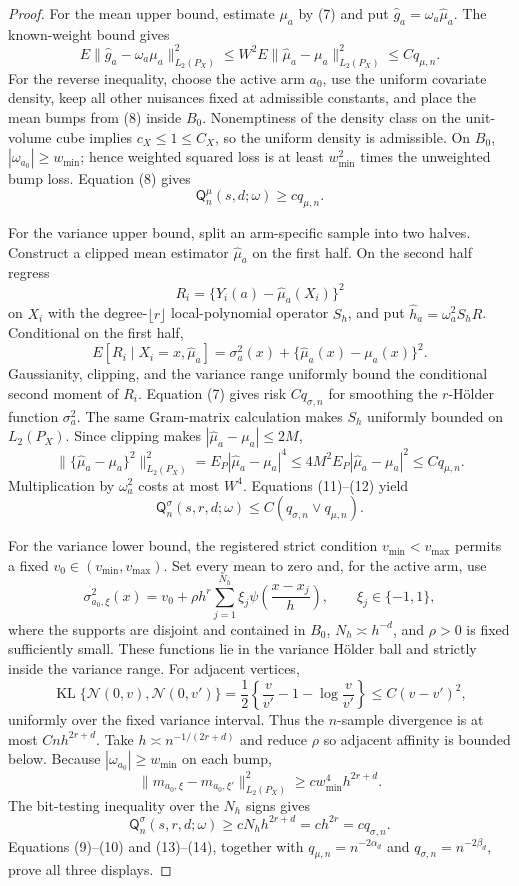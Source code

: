\documentclass{article}
\begin{document}
\begin{proof}
For the mean upper bound, estimate \(\mu_a\) by (7) and put \(\widehat g_a=\omega_a\widehat\mu_a\).  The known-weight bound gives
\[
E\|\widehat g_a-\omega_a\mu_a\|_{L_2(P_X)}^2
\leq W^2E\|\widehat\mu_a-\mu_a\|_{L_2(P_X)}^2
\leq Cq_{\mu,n}.
\tag{9}
\]
For the reverse inequality, choose the active arm \(a_0\), use the uniform covariate density, keep all other nuisances fixed at admissible constants, and place the mean bumps from (8) inside \(B_0\).  Nonemptiness of the density class on the unit-volume cube implies \(c_X\leq1\leq C_X\), so the uniform density is admissible.  On \(B_0\), \(|\omega_{a_0}|\geq w_{\min}\); hence weighted squared loss is at least \(w_{\min}^2\) times the unweighted bump loss.  Equation (8) gives
\[
\mathsf Q_n^{\mu}(s,d;\omega)\geq cq_{\mu,n}.
\tag{10}
\]

For the variance upper bound, split an arm-specific sample into two halves.  Construct a clipped mean estimator \(\widehat\mu_a\) on the first half.  On the second half regress
\[
R_i=\{Y_i(a)-\widehat\mu_a(X_i)\}^2
\]
on \(X_i\) with the degree-\(\lfloor r\rfloor\) local-polynomial operator \(S_h\), and put \(\widehat h_a=\omega_a^2S_hR\).  Conditional on the first half,
\[
E[R_i\mid X_i=x,\widehat\mu_a]
=\sigma_a^2(x)+\{\widehat\mu_a(x)-\mu_a(x)\}^2.
\tag{11}
\]
Gaussianity, clipping, and the variance range uniformly bound the conditional second moment of \(R_i\).  Equation (7) gives risk \(Cq_{\sigma,n}\) for smoothing the \(r\)-Hölder function \(\sigma_a^2\).  The same Gram-matrix calculation makes \(S_h\) uniformly bounded on \(L_2(P_X)\).  Since clipping makes \(|\widehat\mu_a-\mu_a|\leq2M\),
\[
\|\{\widehat\mu_a-\mu_a\}^2\|_{L_2(P_X)}^2
=E_P|\widehat\mu_a-\mu_a|^4
\leq4M^2E_P|\widehat\mu_a-\mu_a|^2
\leq Cq_{\mu,n}.
\tag{12}
\]
Multiplication by \(\omega_a^2\) costs at most \(W^4\).  Equations (11)--(12) yield
\[
\mathsf Q_n^{\sigma}(s,r,d;\omega)
\leq C(q_{\sigma,n}\vee q_{\mu,n}).
\tag{13}
\]

For the variance lower bound, the registered strict condition \(v_{\min}<v_{\max}\) permits a fixed \(v_0\in(v_{\min},v_{\max})\).  Set every mean to zero and, for the active arm, use
\[
\sigma_{a_0,\xi}^2(x)=v_0+\rho h^r\sum_{j=1}^{N_h}\xi_j
\psi\!\left(\frac{x-x_j}{h}\right),
\qquad \xi_j\in\{-1,1\},
\]
where the supports are disjoint and contained in \(B_0\), \(N_h\asymp h^{-d}\), and \(\rho>0\) is fixed sufficiently small.  These functions lie in the variance Hölder ball and strictly inside the variance range.  For adjacent vertices,
\[
\operatorname{KL}\{\mathcal N(0,v),\mathcal N(0,v')\}
=\frac12\left\{\frac{v}{v'}-1-\log\frac{v}{v'}\right\}
\leq C(v-v')^2,
\]
uniformly over the fixed variance interval.  Thus the \(n\)-sample divergence is at most \(Cnh^{2r+d}\).  Take \(h\asymp n^{-1/(2r+d)}\) and reduce \(\rho\) so adjacent affinity is bounded below.  Because \(|\omega_{a_0}|\geq w_{\min}\) on each bump,
\[
\|m_{a_0,\xi}-m_{a_0,\xi'}\|_{L_2(P_X)}^2
\geq c w_{\min}^4h^{2r+d}.
\]
The bit-testing inequality over the \(N_h\) signs gives
\[
\mathsf Q_n^{\sigma}(s,r,d;\omega)
\geq cN_hh^{2r+d}=ch^{2r}=cq_{\sigma,n}.
\tag{14}
\]
Equations (9)--(10) and (13)--(14), together with \(q_{\mu,n}=n^{-2\alpha_d}\) and \(q_{\sigma,n}=n^{-2\beta_d}\), prove all three displays.
\end{proof}
\end{document}
